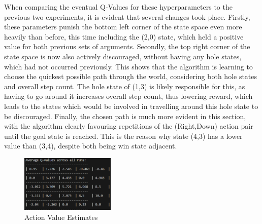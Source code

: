 \documentclass[a4paper,9pt]{scrartcl}
\begin{document}
When comparing the eventual Q-Values for these hyperparameters to the previous two experiments, it is evident that several changes took place.
Firstly, these parameters punish the bottom left corner of the state space even more heavily than before, this time including the (2,0) state,
which held a positive value for both previous sets of arguments. Secondly, the top right corner of the state space is now also actively 
discouraged, without having any hole states, which had not occurred previously. This shows that the algorithm is learning to choose the quickest 
possible path through the world, considering both hole states and overall step count. The hole state of (1,3) is likely responsible for this,
as having to go around it increases overall step count, thus lowering reward, which leads to the states which would be involved in travelling 
around this hole state to be discouraged. Finally, the chosen path is much more evident in this section, with the algorithm clearly favouring
repetitions of the (Right,Down) action pair until the goal state is reached. This is the reason why state (4,3) has a lower value than (3,4),
despite both being win state adjacent. 


\begin{figure}[H]
\centering
\includegraphics[width=0.4\textwidth]{images/qvalues(3).png}
\caption{Action Value Estimates}
\label{fig:set3_qvalues}
\end{figure}
\end{document}
